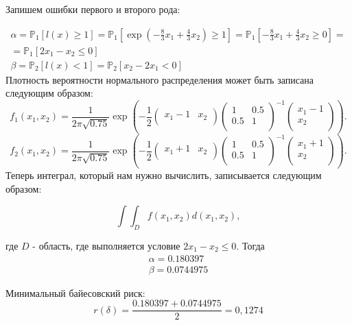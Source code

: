 \documentclass[14pt]{extarticle}
\begin{document}
Запишем ошибки первого и второго рода:

\begin{gather*}
\alpha=\mathbb{P}_1\left[l\left(x\right) \geqslant 1\right]=\mathbb{P}_1\left[\exp \left(-\frac{8}{3}x_1+\frac{4}{3}x_2 \right) \geqslant 1\right]=\mathbb{P}_1\left[-\frac{8}{3}x_1+\frac{4}{3}x_2 \geqslant 0\right]=\\
=\mathbb{P}_1\left[2x_1 - x_2 \leqslant 0\right] \\
\beta=\mathbb{P}_2[l(x)<1]=\mathbb{P}_2[x_2-2x_1<0]
\end{gather*}
Плотность вероятности нормального распределения может быть записана следующим образом:
$$
f_1(x_1, x_2) = \frac{1}{2\pi\sqrt{0.75}} \exp{\left(-\frac{1}{2}\left(\begin{array}{cc}x_1 - 1 & x_2\\ \end{array}\right)\left(\begin{array}{cc}1 & 0.5\\ 0.5 & 1\\ \end{array}\right)^{-1}\left(\begin{array}{c}x_1 - 1\\ x_2\\ \end{array}\right)\right)}.
$$
$$
f_2(x_1, x_2) = \frac{1}{2\pi\sqrt{0.75}} \exp{\left(-\frac{1}{2}\left(\begin{array}{cc}x_1 + 1 & x_2\\ \end{array}\right)\left(\begin{array}{cc}1 & 0.5\\ 0.5 & 1\\ \end{array}\right)^{-1}\left(\begin{array}{c}x_1 + 1\\ x_2\\ \end{array}\right)\right)}.
$$
Теперь интеграл, который нам нужно вычислить, записывается следующим образом:

$$\int\int_D f(x_1, x_2) d(x_1, x_2),$$

где $D$ - область, где выполняется условие $2x_1 - x_2 \leq 0$. Тогда
\begin{gather*}
\alpha = 0.180397 \\
\beta = 0.0744975
\end{gather*}

Минимальный байесовский риск:
$$
r(\delta)= \frac{0.180397 + 0.0744975}{2} = 0,1274
$$
\end{document}
